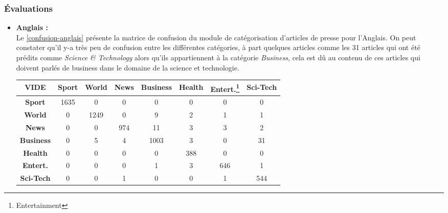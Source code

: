         \subsubsection{Évaluations}
        \begin{itemize}[leftmargin=*]
            \item{\textbf{Anglais :} }\\
                Le \autoref{confusion-anglais} présente la matrice de confusion du module de catégorisation d'articles de presse pour l'Anglais. On peut constater qu'il y-a très peu de confusion entre les différentes catégories, à part quelques articles comme les 31 articles qui ont été prédits comme \emph{Science \& Technology} alors qu'ils appartiennent à la catégorie \emph{Business}, cela est dû au contenu de ces articles qui doivent parlés de business dans le domaine de la science et technologie. 
                \begin{table}[H]
                    \begin{center}
                        \begin{tabular}{|c|c|c|c|c|c|c|c|}
                            \hline
                            \textbf{VIDE} & \textbf{Sport} &  \textbf{World} &  \textbf{News} &  \textbf{Business} &  \textbf{Health} & \textbf{Entert.\footnote{Entertainment}} &  \textbf{Sci-Tech} \\
                            \hline
                            \textbf{Sport} & 1635 & 0 & 0 & 0 & 0 & 0 & 0 \\
                            \hline
                            \textbf{World}  & 0 & 1249 & 0 & 9 & 2 & 1 & 1 \\
                            \hline
                            \textbf{News}  & 0 & 0 & 974 & 11 & 3 & 3 & 2 \\
                            \hline
                            \textbf{Business}  & 0 & 5 & 4 & 1003 & 3 & 0 & 31 \\
                            \hline
                            \textbf{Health}  & 0 & 0 & 0 & 0 & 388 & 0 & 0 \\
                            \hline
                            \textbf{Entert.}  & 0 & 0 & 0 & 1 & 3 & 646 & 1 \\
                            \hline
                            \textbf{Sci-Tech}  & 0 & 0 & 1 & 0 & 0 & 1 & 544 \\
                            \hline
                        \end{tabular}

\end{center}
\end{table}
\end{itemize}

